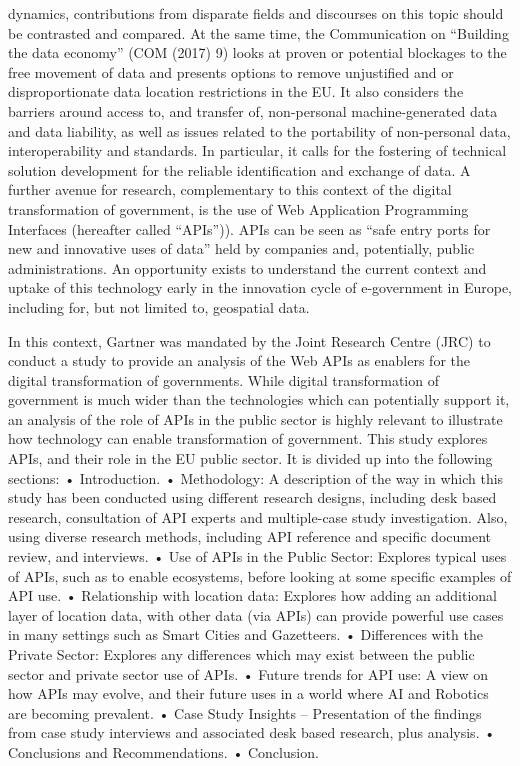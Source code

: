 dynamics, contributions from disparate fields and discourses on this topic should be contrasted and
compared.
At the same time, the Communication on “Building the data economy” (COM (2017) 9) looks at proven or
potential blockages to the free movement of data and presents options to remove unjustified and or
disproportionate data location restrictions in the EU. It also considers the barriers around access to, and
transfer of, non-personal machine-generated data and data liability, as well as issues related to the
portability of non-personal data, interoperability and standards. In particular, it calls for the fostering of
technical solution development for the reliable identification and exchange of data.
A further avenue for research, complementary to this context of the digital transformation of government, is
the use of Web Application Programming Interfaces (hereafter called “APIs”)). APIs can be seen as “safe
entry ports for new and innovative uses of data” held by companies and, potentially, public administrations.
An opportunity exists to understand the current context and uptake of this technology early in the innovation
cycle of e-government in Europe, including for, but not limited to, geospatial data. 

In this context, Gartner was mandated by the Joint Research Centre (JRC) to conduct a study to provide an
analysis of the Web APIs as enablers for the digital transformation of governments. While digital
transformation of government is much wider than the technologies which can potentially support it, an
analysis of the role of APIs in the public sector is highly relevant to illustrate how technology can enable
transformation of government.
This study explores APIs, and their role in the EU public sector. It is divided up into the following sections:
• Introduction.
• Methodology: A description of the way in which this study has been conducted using different
research designs, including desk based research, consultation of API experts and multiple-case
study investigation. Also, using diverse research methods, including API reference and specific
document review, and interviews.
• Use of APIs in the Public Sector: Explores typical uses of APIs, such as to enable ecosystems,
before looking at some specific examples of API use.
• Relationship with location data: Explores how adding an additional layer of location data, with
other data (via APIs) can provide powerful use cases in many settings such as Smart Cities and
Gazetteers.
• Differences with the Private Sector: Explores any differences which may exist between the
public sector and private sector use of APIs.
• Future trends for API use: A view on how APIs may evolve, and their future uses in a world
where AI and Robotics are becoming prevalent.
• Case Study Insights – Presentation of the findings from case study interviews and associated
desk based research, plus analysis.
• Conclusions and Recommendations.
• Conclusion.

